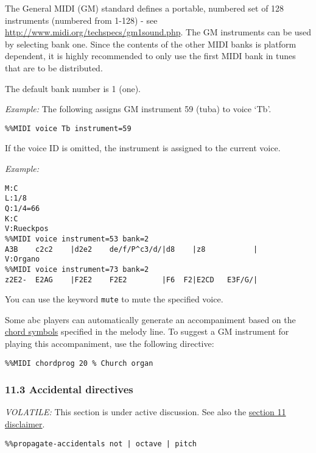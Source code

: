 The General MIDI (GM) standard defines a portable, numbered set of 128
instruments (numbered from 1-128) - see
\url{http://www.midi.org/techspecs/gm1sound.php}. The GM instruments can
be used by selecting bank one. Since the contents of the other MIDI
banks is platform dependent, it is highly recommended to only use the
first MIDI bank in tunes that are to be distributed.

The default bank number is 1 (one).

\emph{Example:} The following assigns GM instrument 59 (tuba) to voice
`Tb'.

\begin{verbatim}
%%MIDI voice Tb instrument=59
\end{verbatim}

If the voice ID is omitted, the instrument is assigned to the current
voice.

\emph{Example:}

\begin{verbatim}
M:C
L:1/8
Q:1/4=66
K:C
V:Rueckpos
%%MIDI voice instrument=53 bank=2
A3B    c2c2    |d2e2    de/f/P^c3/d/|d8    |z8           |
V:Organo
%%MIDI voice instrument=73 bank=2
z2E2-  E2AG    |F2E2    F2E2        |F6  F2|E2CD   E3F/G/|
\end{verbatim}

You can use the keyword \texttt{mute} to mute the specified voice.

Some abc players can automatically generate an accompaniment based on
the \protect\hyperlink{chord_symbols}{chord symbols} specified in the
melody line. To suggest a GM instrument for playing this accompaniment,
use the following directive:

\begin{verbatim}
%%MIDI chordprog 20 % Church organ
\end{verbatim}

\hypertarget{accidental_directives}{\subsubsection{11.3 Accidental
directives}\label{accidental_directives}}

\emph{VOLATILE:} This section is under active discussion. See also the
\protect\hyperlink{disclaimer}{section 11 disclaimer}.

\begin{verbatim}
%%propagate-accidentals not | octave | pitch
\end{verbatim}

